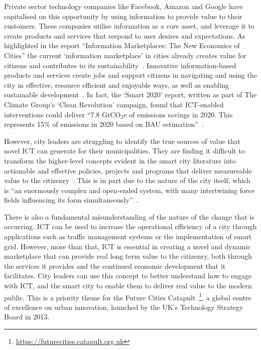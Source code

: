 \documentclass[conference]{IEEEtran}
\begin{document}
Private sector technology companies like Facebook, Amazon and Google
have capitalised on this opportunity by using information to provide
value to their customers. These companies utilise information as a
core asset, and leverage it to create products and services that
respond to user desires and expectations. As highlighted in the report
``Information Marketplaces: The New Economics of Cities'' the current
`information marketplace' in cities already creates value for citizens
and contributes to its
sustainability~\cite{arup-et-al:2011}. Innovative information-based
products and services create jobs and support citizens in navigating
and using the city in effective, resource efficient and enjoyable
ways, as well as enabling sustainable
development~\cite{consustict:2008,ciscoconcities:2010}. In fact, the
`Smart 2020' report, written as part of The Climate Group's `Clean
Revolution' campaign, found that ICT-enabled interventions could
deliver ``7.8 GtCO$_2$e of emissions savings in 2020. This represents
15\% of emissions in 2020 based on BAU
estimation''~\cite{smart2020:2008}.

However, city leaders are struggling to identify the true sources of
value that novel ICT can generate for their municipalities. They are
finding it difficult to transform the higher-level concepts evident in
the smart city literature into actionable and effective policies,
projects and programs that deliver measureable value to the
citizenry~\cite{hollands:2008}. This is in part due to the nature of
the city itself, which is ``an enormously complex and open-ended
system, with many intertwining force fields influencing its form
simultaneously''~\cite{sevtsuk+beinart:2005}.

There is also a fundamental misunderstanding of the nature of the
change that is occurring. ICT can be used to increase the operational
efficiency of a city through applications such as traffic management
systems or the implementation of smart grid. However, more than that,
ICT is essential in creating a novel and dynamic marketplace that can
provide real long term value to the citizenry, both through the
services it provides and the continued economic development that it
facilitates. City leaders can use this concept to better understand
how to engage with ICT, and the smart city to enable them to deliver
real value to the modern public. This is a priority theme for the
Future Cities
Catapult~\footnote{\url{https://futurecities.catapult.org.uk}}, a
global centre of excellence on urban innovation, launched by the UK's
Technology Strategy Board in 2013.
\end{document}

